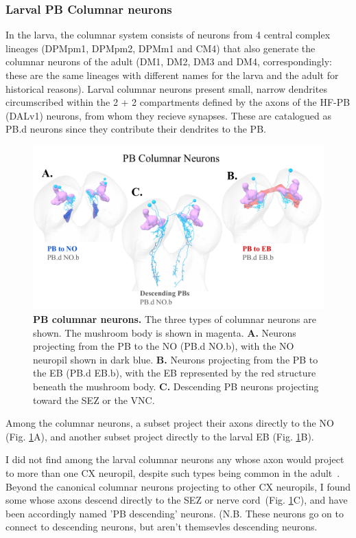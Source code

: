         \subsubsection{Larval PB Columnar neurons}

    In the larva, the columnar system consists of neurons from 4 central complex lineages (DPMpm1, DPMpm2, DPMm1 and CM4) that also generate the columnar neurons of the adult (DM1, DM2, DM3 and DM4, correspondingly: these are the same lineages with different names for the larva and the adult for historical reasons).
    Larval columnar neurons present small, narrow dendrites circumscribed within the 2 + 2 compartments defined by the axons of the HF-PB (DALv1) neurons, from whom they recieve synapses. These are catalogued as PB.d neurons since they contribute their dendrites to the PB.

        \begin{figure}[H]
            \centering
            \includegraphics[width=12cm]{Figs/CX/PBcolumnar.pdf}
            \caption[PB columnar neurons]{\textbf{PB columnar neurons.} The three types of columnar neurons are shown. The mushroom body is shown in magenta. \textbf{A.} Neurons projecting from the PB to the NO (PB.d NO.b), with the NO neuropil shown in dark blue. \textbf{B.} Neurons projecting from the PB to the EB (PB.d EB.b), with the EB represented by the red structure beneath the mushroom body. \textbf{C.} Descending PB neurons projecting toward the SEZ or the VNC.}
            \label{pbcolumnar}
        \end{figure}

    Among the columnar neurons, a subset project their axons directly to the NO (Fig. \ref{pbcolumnar}A), and another subset project directly to the larval EB (Fig. \ref{pbcolumnar}B).

    I did not find among the larval columnar neurons any whose axon would project to more than one CX neuropil, despite such types being common in the adult~\citep{wolff2015neuroarchitecture, wolff2018neuroarchitecture, hulse2021connectome}.
    Beyond the canonical columnar neurons projecting to other CX neuropils, I found some whose axons descend directly to the SEZ or nerve cord~(Fig. \ref{pbcolumnar}C), and have been accordingly named 'PB descending' neurons. (N.B. These neurons go on to connect to descending neurons, but aren't themsevles descending neurons.

